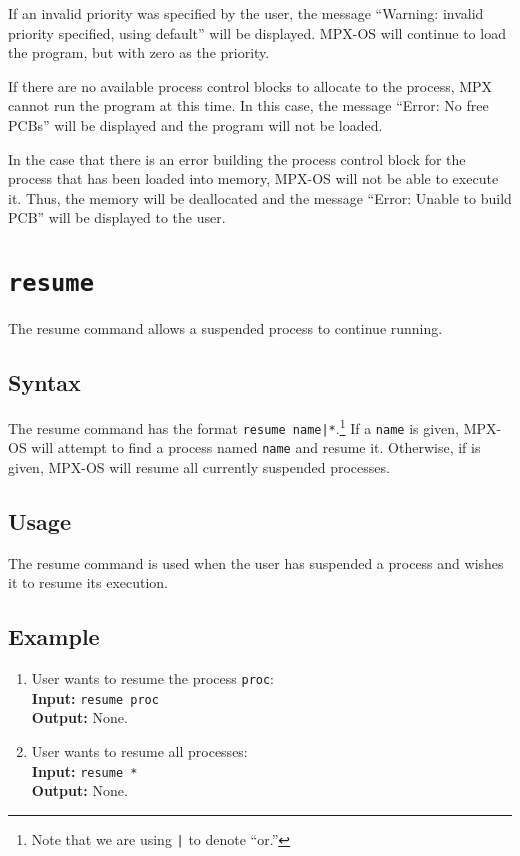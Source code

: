 If an invalid priority was specified by the user, the message ``Warning: invalid priority
specified, using default'' will be displayed. MPX-OS will continue to load the program,
but with zero as the priority.

If there are no available process control blocks to allocate to the process, MPX cannot
run the program at this time. In this case, the message ``Error: No free PCBs'' will be
displayed and the program will not be loaded.

In the case that there is an error building the process control block for the process that
has been loaded into memory, MPX-OS will not be able to execute it. Thus, the memory will
be deallocated and the message ``Error: Unable to build PCB'' will be displayed to the
user.






\section{\tt resume}
\label{resume_cmd}

The resume command allows a suspended process to continue running.

\subsection{Syntax}

The resume command has the format {\tt resume name|*}.\footnote{Note that we are using {\tt |} to denote ``or.''} If a {\tt name} is given, MPX-OS 
will attempt to find a process named {\tt name} and resume it. Otherwise, if {\tt *} is 
given, MPX-OS will resume all currently suspended processes.

\subsection{Usage}

The resume command is used when the user has suspended a process and wishes it to resume
its execution.

\subsection{Example}
\begin{enumerate}
    \item User wants to resume the process {\tt proc}: \\
        {\bf Input:} {\tt resume proc} \\
        {\bf Output:} None.
    \item User wants to resume all processes: \\
        {\bf Input:} {\tt resume *} \\
        {\bf Output:} None.
\end{enumerate}
